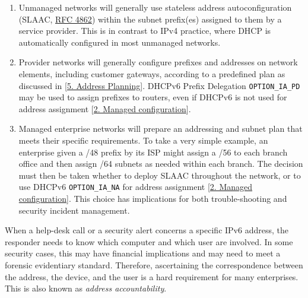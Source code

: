 \documentclass[
]{article}
\begin{document}
\begin{enumerate}
\def\labelenumi{\arabic{enumi}.}
\item
  Unmanaged networks will generally use stateless address
  autoconfiguration (SLAAC,
  \href{https://www.rfc-editor.org/info/rfc4862}{RFC 4862}) within the
  subnet prefix(es) assigned to them by a service provider. This is in
  contrast to IPv4 practice, where DHCP is automatically configured in
  most unmanaged networks.
\item
  Provider networks will generally configure prefixes and addresses on
  network elements, including customer gateways, according to a
  predefined plan as discussed in {[}\hyperref[address-planning]{5.
  Address Planning}{]}. DHCPv6 Prefix Delegation \texttt{OPTION\_IA\_PD}
  may be used to assign prefixes to routers, even if DHCPv6 is not used
  for address assignment {[}\hyperref[managed-configuration]{2. Managed
  configuration}{]}.
\item
  Managed enterprise networks will prepare an addressing and subnet plan
  that meets their specific requirements. To take a very simple example,
  an enterprise given a /48 prefix by its ISP might assign a /56 to each
  branch office and then assign /64 subnets as needed within each
  branch. The decision must then be taken whether to deploy SLAAC
  throughout the network, or to use DHCPv6 \texttt{OPTION\_IA\_NA} for
  address assignment {[}\hyperref[managed-configuration]{2. Managed
  configuration}{]}. This choice has implications for both
  trouble-shooting and security incident management.
\end{enumerate}

When a help-desk call or a security alert concerns a specific IPv6
address, the responder needs to know which computer and which user are
involved. In some security cases, this may have financial implications
and may need to meet a forensic evidentiary standard. Therefore,
ascertaining the correspondence between the address, the device, and the
user is a hard requirement for many enterprises. This is also known as
\emph{address accountability}.
\end{document}
